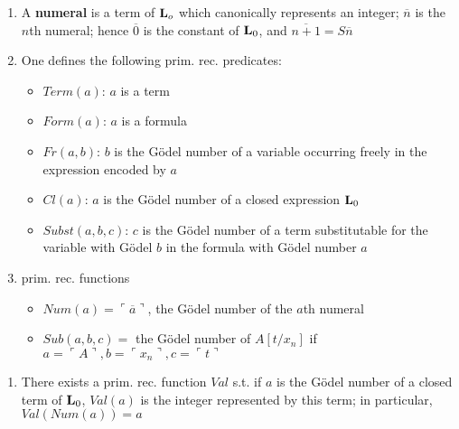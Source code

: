 \documentclass[11pt]{article}
\begin{document}
\begin{definition}[]
\begin{enumerate}
\item A \textbf{numeral} is a term of \(\operatorname{\textbf{L}}_o\) which canonically represents an integer;
\(\overline{n}\) is the \(n\)th numeral; hence \(\overline{0}\) is the constant
of \(\operatorname{\textbf{L}}_0\), and \(\overline{n+1}=S\overline{n}\)
\item One defines the following prim. rec. predicates:
\begin{itemize}
\item \(Term(a)\): \(a\) is a term
\item \(Form(a)\): \(a\) is a formula
\item \(Fr(a,b)\): \(b\) is the Gödel number of a variable occurring freely in the
expression encoded by \(a\)
\item \(Cl(a)\): \(a\) is the Gödel number of a closed expression \(\operatorname{\textbf{L}}_0\)
\item \(Subst(a,b,c)\): \(c\) is the Gödel number of a term substitutable for the
variable with Gödel \(b\) in the formula with Gödel number \(a\)
\end{itemize}
\item prim. rec. functions
\begin{itemize}
\item \(Num(a)=\ulcorner\overline{a}\urcorner\), the Gödel number of the \(a\)th
numeral
\item \(Sub(a,b,c)=\) the Gödel number of \(A[t/x_n]\) if \(a=\ulcorner
     A\urcorner,b=\ulcorner x_n\urcorner,c=\ulcorner t\urcorner\)
\end{itemize}
\end{enumerate}
\end{definition}


\begin{theorem}[]
\begin{enumerate}
\item There exists a prim. rec. function \(Val\) s.t. if \(a\) is the Gödel number of a
closed term of \(\operatorname{\textbf{L}}_0\), \(Val(a)\) is the integer represented by this term; in
particular, \(Val(Num(a))=a\)
\end{enumerate}
\end{theorem}
\end{document}
